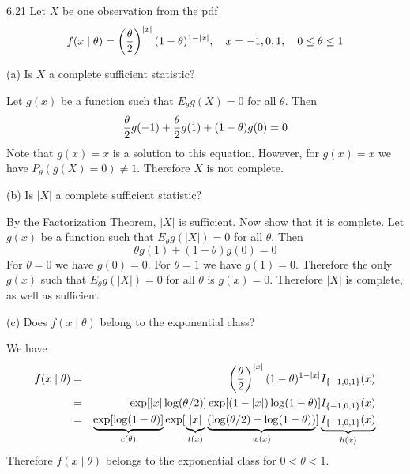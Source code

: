 \documentclass[12pt]{article}
\begin{document}
6.21
Let $X$ be one observation from the pdf
$$f(x\mid\theta)=\left({\theta\over2}\right)^{|x|}
(1-\theta)^{1-|x|},\quad x=-1,0,1,\quad 0\le\theta\le1$$

\bigskip
\noindent
(a) Is $X$ a complete sufficient statistic?

\bigskip
\noindent
Let $g(x)$ be a function such that $E_\theta g(X)=0$ for all $\theta$.
Then
$${\theta\over2}g(-1)+{\theta\over2}g(1)+(1-\theta)g(0)=0$$
Note that $g(x)=x$ is a solution to this equation.
However, for $g(x)=x$ we have $P_\theta(g(X)=0)\ne1$.
Therefore $X$ is not complete.

\bigskip
\noindent
(b) Is $|X|$ a complete sufficient statistic?

\bigskip
\noindent
By the Factorization Theorem, $|X|$ is sufficient.
Now show that it is complete.
Let $g(x)$ be a function such that $E_\theta g(|X|)=0$ for all
$\theta$.
Then
$$\theta g(1)+(1-\theta)g(0)=0$$
For $\theta=0$ we have $g(0)=0$.
For $\theta=1$ we have $g(1)=0$.
Therefore the only $g(x)$ such that
$E_\theta g(|X|)=0$ for all $\theta$ is $g(x)=0$.
Therefore $|X|$ is complete, as well as sufficient.

\bigskip
\noindent
(c) Does $f(x\mid\theta)$ belong to the exponential class?

\bigskip
\noindent
We have
\begin{eqnarray*}
f(x\mid\theta)
&=&
\left({\theta\over2}\right)^{|x|}(1-\theta)^{1-|x|}I_{\{-1,0,1\}}(x)\\
&=&
\exp[|x|\log(\theta/2)]\exp[(1-|x|)\log(1-\theta)]I_{\{-1,0,1\}}(x)\\
&=&
\underbrace{\exp[\log(1-\theta)]}_{c(\theta)}
\exp[
\underbrace{|x|}_{t(x)}
\underbrace{(\log(\theta/2)-\log(1-\theta))}_{w(x)}
]
\underbrace{I_{\{-1,0,1\}}(x)}_{h(x)}
\end{eqnarray*}
Therefore $f(x\mid\theta)$ belongs to the exponential class for
$0<\theta<1$.
\end{document}
